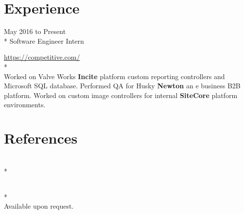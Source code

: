 \documentclass[a4paper,margin,line]{resume}
\newcommand{\rurl}[1]{\hfill {\footnotesize \url{#1}}}
\newcommand{\rdate}[1]{\hfill {\small #1}}
\newcommand{\rproject}[4]{\item[#1] \hfill \rdate{#2} \\* \hfill \rdate{#3} \strut\hfill \rurl{#4} \\*}
\begin{document}
\begin{resume}
\begin{asparadesc}
    \end{asparadesc}

\section{\mysidestyle Experience}
	\begin{asparadesc}
        \rproject{Competitive Computing}{May 2016 to Present}{Software Engineer Intern}{https://competitive.com/}
        \\
        \small
        Worked on Valve Works  {\bf Incite} platform custom reporting controllers and Microsoft SQL database. Performed QA for Husky {\bf Newton} an e business B2B platform. Worked on custom image controllers for internal {\bf SiteCore} platform environments.
        \normalsize
        \\
{}
    \end{asparadesc}

\section{\mysidestyle References}
	\begin{asparadesc}
	\rproject{}{}{}{}
	\\
		\small
		Available upon request.
		\normalsize
		\\
{}
    \end{asparadesc}
	
\end{resume}
\end{document}
